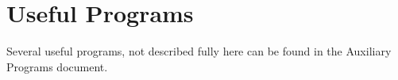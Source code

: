 \section{Useful Programs}\label{useful-programs}

Several useful programs, not described fully here can be found in the Auxiliary Programs document.
